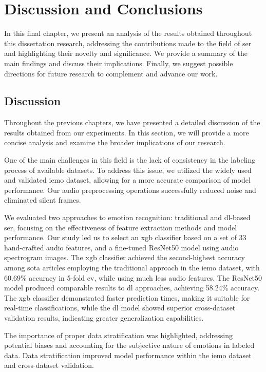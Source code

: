 \chapter{Discussion and Conclusions}
\label{chapter:conc}

In this final chapter, we present an analysis of the results obtained throughout this dissertation research, addressing the contributions made to the field of \ac{ser} and highlighting their novelty and significance. We provide a summary of the main findings and discuss their implications. Finally, we suggest possible directions for future research to complement and advance our work.

\section{Discussion}

Throughout the previous chapters, we have presented a detailed discussion of the results obtained from our experiments. In this section, we will provide a more concise analysis and examine the broader implications of our research.

One of the main challenges in this field is the lack of consistency in the labeling process of available datasets. To address this issue, we utilized the widely used and validated \ac{iemo} dataset, allowing for a more accurate comparison of model performance. Our audio preprocessing operations successfully reduced noise and eliminated silent frames.

We evaluated two approaches to emotion recognition: traditional and \ac{dl}-based \ac{ser}, focusing on the effectiveness of feature extraction methods and model performance. Our study led us to select an \ac{xgb} classifier based on a set of 33 hand-crafted audio features, and a fine-tuned ResNet50 model using audio spectrogram images. The \ac{xgb} classifier achieved the second-highest accuracy among \ac{sota} articles employing the traditional approach in the \ac{iemo} dataset, with 60.69\% accuracy in 5-fold \ac{cv}, while using much less audio features. The ResNet50 model produced comparable results to \ac{dl} approaches, achieving 58.24\% accuracy. The \ac{xgb} classifier demonstrated faster prediction times, making it suitable for real-time classifications, while the \ac{dl} model showed superior cross-dataset validation results, indicating greater generalization capabilities.

The importance of proper data stratification was highlighted, addressing potential biases and accounting for the subjective nature of emotions in labeled data. Data stratification improved model performance within the \ac{iemo} dataset and cross-dataset validation.

